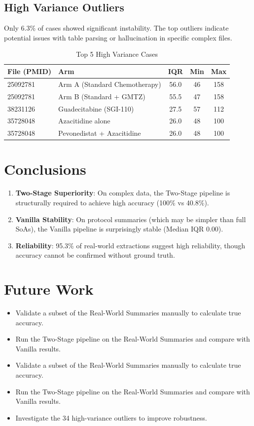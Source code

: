 \documentclass[11pt, a4paper]{article}
\begin{document}
\subsection{High Variance Outliers}
Only 6.3\% of cases showed significant instability. The top outliers indicate potential issues with table parsing or hallucination in specific complex files.

\begin{table}[H]
    \centering
    \caption{Top 5 High Variance Cases}
    \begin{tabular}{llccc}
        \toprule
        \textbf{File (PMID)} & \textbf{Arm} & \textbf{IQR} & \textbf{Min} & \textbf{Max} \\
        \midrule
        25092781 & Arm A (Standard Chemotherapy) & 56.0 & 46 & 158 \\
        25092781 & Arm B (Standard + GMTZ) & 55.5 & 47 & 158 \\
        38231126 & Guadecitabine (SGI-110) & 27.5 & 57 & 112 \\
        35728048 & Azacitidine alone & 26.0 & 48 & 100 \\
        35728048 & Pevonedistat + Azacitidine & 26.0 & 48 & 100 \\
        \bottomrule
    \end{tabular}
\end{table}

\section{Conclusions}
\begin{enumerate}
    \item \textbf{Two-Stage Superiority}: On complex data, the Two-Stage pipeline is structurally required to achieve high accuracy (100\% vs 40.8\%).
    \item \textbf{Vanilla Stability}: On protocol summaries (which may be simpler than full SoAs), the Vanilla pipeline is surprisingly stable (Median IQR 0.00).
    \item \textbf{Reliability}: 95.3\% of real-world extractions suggest high reliability, though accuracy cannot be confirmed without ground truth.
\end{enumerate}

\section{Future Work}
\begin{itemize}
    \item Validate a subset of the Real-World Summaries manually to calculate true accuracy.
    \item Run the Two-Stage pipeline on the Real-World Summaries and compare with Vanilla results.
    \item Validate a subset of the Real-World Summaries manually to calculate true accuracy.
    \item Run the Two-Stage pipeline on the Real-World Summaries and compare with Vanilla results.
    \item Investigate the 34 high-variance outliers to improve robustness.
\end{itemize}
\end{document}
